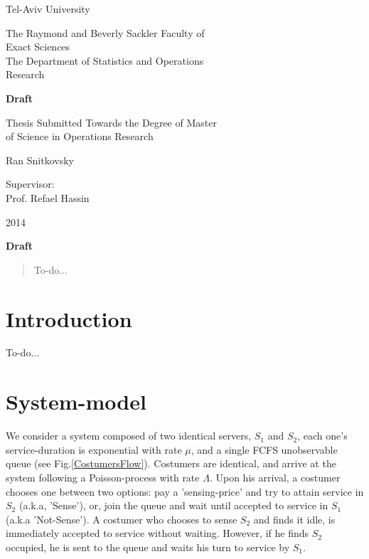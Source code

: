 \documentclass[11pt]{article}
\numberwithin{equation}{section}
\begin{document}
\begin{center} 
\Large {Tel-Aviv University}

\Large {The Raymond and Beverly Sackler Faculty of} \\
\Large {Exact Sciences} \\
\Large {The Department of Statistics and Operations} \\
\Large {Research}

\bigskip
\bigskip
\bigskip

\Large {\bf Draft }

\bigskip
\bigskip
\bigskip
\bigskip

\Large{Thesis Submitted Towards the Degree of Master} \\
\Large {of Science in Operations Research}

\bigskip

\Large {Ran Snitkovsky}

\bigskip
\bigskip
\bigskip

\Large {Supervisor:} \\
\Large {Prof. Refael Hassin}

\bigskip
\bigskip

\Large{2014}

\end{center}

\newpage

\begin{center} \Large {\bf Draft}
\end{center}

\begin{abstract} 

To-do...

\newpage

\end{abstract}

\section{Introduction}

To-do...

\newpage

\section{System-model}

We consider a system composed of two identical servers, $S_{1}$ and $S_{2}$, each one's service-duration is exponential with rate $\mu$, and a single FCFS unobservable queue (see Fig.\ref{CostumersFlow}). Costumers are identical, and arrive at the system following a Poisson-process with rate $\Lambda$. Upon his arrival, a costumer chooses one between two options: pay a 'sensing-price' and try to attain service in $S_{2}$ (a.k.a, 'Sense'), or, join the queue and wait until accepted to service in $S_{1}$ (a.k.a 'Not-Sense'). A costumer who chooses to sense $S_{2}$ and finds it idle, is immediately accepted to service without waiting. However, if he finds $S_{2}$ occupied, he is sent to the queue and waits his turn to service by $S_{1}$.
\end{document}
